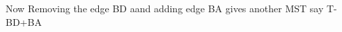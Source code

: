 \documentclass[preview]{standalone}
\begin{document}
\begin{center}
Now Removing the edge BD aand adding edge BA gives another MST say T-BD+BA
\end{center}
\end{document}

